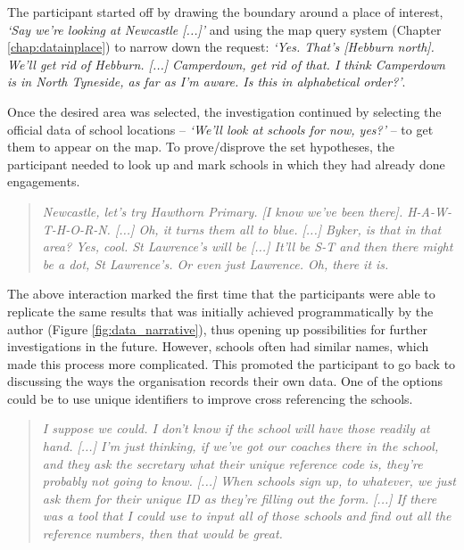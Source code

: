 The participant started off by drawing the boundary around a place of interest, \textit{`Say we're looking at Newcastle [...]'} and using the map query system (Chapter \ref{chap:datainplace}) to narrow down the request: \textit{`Yes. That's [Hebburn north]. We'll get rid of Hebburn. [...] Camperdown, get rid of that. I think Camperdown is in North Tyneside, as far as I'm aware. Is this in alphabetical order?'}.  

Once the desired area was selected, the investigation continued by selecting the official data of school locations -- \textit{`We'll look at schools for now, yes?'} -- to get them to appear on the map. To prove/disprove the set hypotheses, the participant needed to look up and mark schools in which they had already done engagements. 
\begin{quote}
    \textit{Newcastle, let's try Hawthorn Primary. [I know we've been there]. H-A-W-T-H-O-R-N. [...] Oh, it turns them all to blue. [...] Byker, is that in that area? Yes, cool. St Lawrence's will be [...] It'll be S-T and then there might be a dot, St Lawrence's. Or even just Lawrence. Oh, there it is.}
\end{quote}
The above interaction marked the first time that the participants were able to replicate the same results that was initially achieved programmatically by the author (Figure \ref{fig:data_narrative}), thus opening up possibilities for further investigations in the future. However, schools often had similar names, which made this process more complicated. This promoted the participant to go back to discussing the ways the organisation records their own data. One of the options could be to use unique identifiers to improve cross referencing the schools.
\begin{quote}
    \textit{I suppose we could. I don't know if the school will have those readily at hand. [...] I'm just thinking, if we've got our coaches there in the school, and they ask the secretary what their unique reference code is, they're probably not going to know. [...] When schools sign up, to whatever, we just ask them for their unique ID as they're filling out the form. [...] If there was a tool that I could use to input all of those schools and find out all the reference numbers, then that would be great.}
\end{quote}

